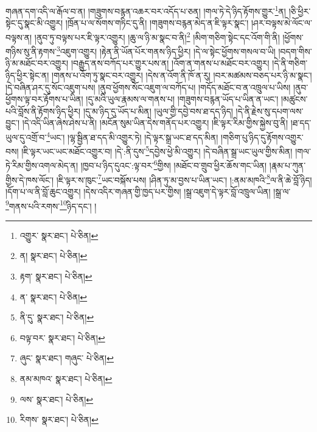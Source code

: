 གཞན་དག་འདི་ལ་རྒོལ་བ་ན། །གཟུགས་བརྙན་འཆར་བར་འདོད་པ་ཅན། །གལ་ཏེ་དེ་ཉིད་རྟོགས་གྱུར་\footnote{འགྱུར་  སྣར་ཐང་།  པེ་ཅིན། }ན། །ཅི་ཕྱིར་སྟེང་དུ་སྣང་མི་འགྱུར། །ཁྲོན་པ་ལ་སོགས་གཏིང་དུ་ནི། །གཟུགས་བརྙན་མེད་ན་ཇི་ལྟར་སྣང་། །ཤར་བལྟས་མེ་ལོང་ལ་བལྟས་ན། །ནུབ་ཏུ་བལྟས་པར་ཇི་ལྟར་འགྱུར། །ཆུ་ལ་ཉི་མ་སྣང་བ་ནི།\footnote{ན།  སྣར་ཐང་།  པེ་ཅིན། } །མིག་གཅིག་སྟེང་དང་འོག་གི་ནི། །ཕྱོགས་གཉིས་སུ་ནི་རྟགས་\footnote{རྟག་  སྣར་ཐང་།  པེ་ཅིན། }འཇུག་འགྱུར། །རྟེན་ནི་ཡོན་པོར་གནས་ཉིད་ཕྱིར། །དེ་ལ་སྟེང་ཕྱོགས་གསལ་བ་ཡི། །བདག་གིས་ཉི་མ་མཐོང་བར་འགྱུར། །བརྒྱུད་ནས་བཀོད་པར་གྱུར་པས་ན། །འོག་ན་གནས་པ་མཐོང་བར་འགྱུར། །དེ་ནི་གཅིག་ཉིད་ཕྱིར་སྟེང་ན། །གནས་པ་འོག་ཏུ་སྣང་བར་འགྱུར། །དེས་ན་འོག་ནི་ཁོ་ན་རུ། །བར་མཚམས་བཅད་པར་ཉི་མ་སྣང་། །དེ་བཞིན་ཤར་དུ་སོང་འཇུག་པས། །ནུབ་ཕྱོགས་སོང་འཇུག་ལ་བཀོད་པ། །གདོད་མཐོང་བ་ན་འཁྲུལ་པ་ཡིས། །ནུབ་ཕྱོགས་ལྟ་བར་རྟོགས་པ་ཡིན། །དུ་མའི་ཡུལ་རྣམས་ལ་གནས་པ། །གཟུགས་བརྙན་ཡོད་པ་ཡིན་ན་ཡང་། །མཚུངས་པའི་བློས་ནི་རྟོགས་ཉིད་ཕྱིར། །དུ་མ་ཉིད་དུ་ཡོད་པ་མིན། །ཡུལ་གྱི་དབྱེ་བས་ཐ་དད་ཉིད། །དེ་ནི་རྗེས་སུ་དཔག་ལས་བྱུང་། །དེ་འདི་ཡིན་ཞེས་ཤེས་པ་ནི། །མངོན་སུམ་ཡིན་དེས་གནོད་པར་འགྱུར། །ཇི་ལྟར་རིམ་གྱིས་སྐྱེས་བུ་ནི། །ཐ་དད་ཡུལ་དུ་འགྲོ་བ་\footnote{ན་  སྣར་ཐང་།  པེ་ཅིན། }ཡང་། །ལྷ་སྦྱིན་ཐ་དད་མི་འགྱུར་ཏེ། །དེ་ལྟར་སྒྲ་ཡང་ཐ་དད་མིན། །གཅིག་པུ་ཉིད་དུ་རྟོགས་འགྱུར་བས། །ཇི་ལྟར་ཡང་ཡང་མཐོང་འགྱུར་བ། །དེ་:ནི་དུས་\footnote{ནི་དུ་  སྣར་ཐང་།  པེ་ཅིན། }དབྱེས་ཕྱེ་མི་འགྱུར། །དེ་བཞིན་སྒྲ་ཡང་ཡུལ་གྱིས་མིན། །གལ་ཏེ་རིམ་གྱིས་འགལ་མེད་ན། །ཁྱབ་པ་ཉིད་དུའང་:ལྟ་བར་\footnote{བལྟ་བར་  སྣར་ཐང་།  པེ་ཅིན། }གྱིས། །མཐོང་བ་གྲུབ་ཕྱིར་ཆོས་གང་ཡིན། །རྣམ་པ་ཀུན་གྱིས་དེ་ཁས་ལོང་། །ཇི་ལྟར་ས་ཁུང་\footnote{ཞུང་  སྣར་ཐང་། གཞུང་  པེ་ཅིན། }ཡང་བསྐོས་པས། །ཤིན་ཏུ་མ་བྱས་པ་ཡིན་ཡང་། །:ནམ་མཁའི་\footnote{ནམ་མཁའ་  སྣར་ཐང་།  པེ་ཅིན། }ལ་ནི་ཆེ་བློ་ཉིད། །དོག་པ་ལ་ནི་བློ་ཆུང་འགྱུར། །དེས་འདིར་གཞན་གྱི་ཁྱད་པར་གྱིས། །སྒྲ་འཇུག་དེ་ལྟར་བློ་འཁྲུལ་ཡིན། །སྒྲ་ལ་\footnote{ལས་  སྣར་ཐང་།  པེ་ཅིན། }གནས་པའི་རགས་\footnote{རིགས་  སྣར་ཐང་།  པེ་ཅིན། }ཉིད་དང་། །
